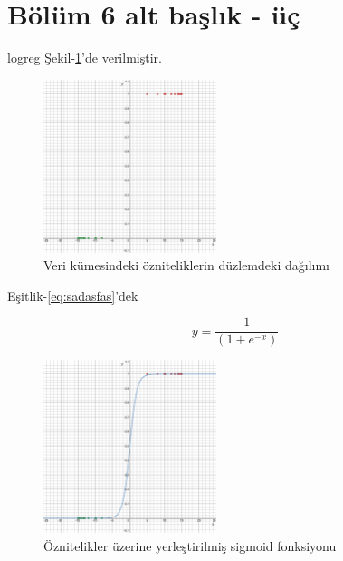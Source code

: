 \section{Bölüm 6 alt başlık - üç}
 \lipsum[1-2]



\acrfull{logreg} 
\lipsum[5]
Şekil-\ref{fig:ghsakjh}'de verilmiştir.  

\begin{figure}[htp]
\centering
\includegraphics[width=0.45\textwidth]{gorseller/graph1.png}
\caption{Veri kümesindeki özniteliklerin düzlemdeki dağılımı}\label{fig:ghsakjh}
\end{figure}

 Eşitlik-\ref{eq:sadasfas}'dek

\begin{equation}
y = \frac{1}{(1+e^{-x})}
\label{eq:sadasfas}%
\end{equation}

\begin{figure}[htp]
\centering
\includegraphics[width=0.45\textwidth]{gorseller/graph2.png}
\caption{Öznitelikler üzerine yerleştirilmiş sigmoid fonksiyonu}\label{fig:ghsakjh2}
\end{figure}

